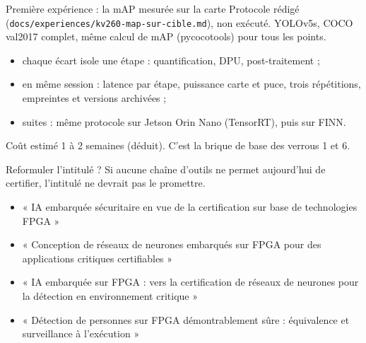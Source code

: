 \documentclass[aspectratio=169,11pt]{beamer}
\begin{document}
\begin{frame}{Première expérience : la mAP mesurée sur la carte}
  \small
  Protocole rédigé (\texttt{docs/experiences/kv260-map-sur-cible.md}), non exécuté.
  YOLOv5s, COCO val2017 complet, même calcul de mAP (pycocotools) pour tous les points.

  \vspace{0.3em}
  \centering

  \raggedright
  \begin{itemize}
    \item chaque écart isole une étape : quantification, DPU, post-traitement ;
    \item en même session : latence par étape, puissance carte et puce, trois répétitions,
          empreintes et versions archivées ;
    \item suites : même protocole sur Jetson Orin Nano (TensorRT), puis sur FINN.
  \end{itemize}
  {\scriptsize Coût estimé 1 à 2 semaines {\color{acc}(déduit)}. C'est la brique de base des
  verrous 1 et 6.}
\end{frame}

\begin{frame}{Reformuler l'intitulé ?}
  Si aucune chaîne d'outils ne permet aujourd'hui de certifier, l'intitulé ne devrait pas
  le promettre.

  \vspace{0.8em}
  \begin{itemize}
    \item « IA embarquée sécuritaire \alert{en vue de} la certification sur base de technologies
          FPGA »
    \item « Conception de réseaux de neurones embarqués sur FPGA pour des applications
          critiques \alert{certifiables} »
    \item « IA embarquée sur FPGA : \alert{vers la certification} de réseaux de neurones pour
          la détection en environnement critique »
    \item « Détection de personnes sur FPGA \alert{démontrablement sûre} : équivalence et
          surveillance à l'exécution »
  \end{itemize}
\end{frame}
\end{document}
